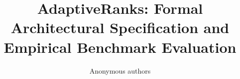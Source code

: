 \title{\textbf{AdaptiveRanks: Formal Architectural Specification and Empirical Benchmark Evaluation}}

\author{Anonymous authors}
